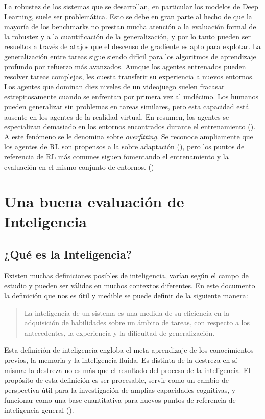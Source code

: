 La robustez de los sistemas que se desarrollan, en particular los modelos de Deep Learning, suele ser problemática. Esto se debe en gran parte al hecho de que la mayoría de los benchmarks no prestan mucha atención a la evaluación formal de la robustez y a la cuantificación de la generalización, y por lo tanto pueden ser resueltos a través de atajos que el descenso de gradiente es apto para explotar. La generalización entre tareas sigue siendo difícil para los algoritmos de aprendizaje profundo por refuerzo más avanzados. Aunque los agentes entrenados pueden resolver tareas complejas, les cuesta transferir su experiencia a nuevos entornos. Los agentes que dominan diez niveles de un videojuego suelen fracasar estrepitosamente cuando se enfrentan por primera vez al undécimo. Los humanos pueden generalizar sin problemas en tareas similares, pero esta capacidad está ausente en los agentes de la realidad virtual. En resumen, los agentes se especializan demasiado en los entornos encontrados durante el entrenamiento (\cite{cobbe2019quantifying}). A este fenómeno se le denomina sobre \textit{overfitting}. Se reconoce ampliamente que los agentes de RL son propensos a la sobre adaptación (\cite{zhang2018study}), pero los puntos de referencia de RL más comunes siguen fomentando el entrenamiento y la evaluación en el mismo conjunto de entornos. (\cite{nichol2018gotta}) 

\section{Una buena evaluación de Inteligencia}\label{section:state-of-the-art:a-good-measure-of-inteligence}

\subsection{¿Qué es la Inteligencia?}
Existen muchas definiciones posibles de inteligencia, varían según el campo de estudio y pueden ser válidas en muchos contextos diferentes. En este documento la definición que nos es útil y medible se puede definir de la siguiente manera:

\begin{quote}
    La inteligencia de un sistema es una medida de su eficiencia en la adquisición de habilidades sobre un ámbito de tareas, con respecto a los antecedentes, la experiencia y la dificultad de generalización.
\end{quote}

Esta definición de inteligencia engloba el meta-aprendizaje de los conocimientos previos, la memoria y la inteligencia fluida. Es distinta de la destreza en sí misma: la destreza no es más que el resultado del proceso de la inteligencia. El propósito de esta definición es ser procesable, servir como un cambio de perspectiva útil para la investigación de amplias capacidades cognitivas, y funcionar como una base cuantitativa para nuevos puntos de referencia de inteligencia general (\cite{chollet2019measure}).

